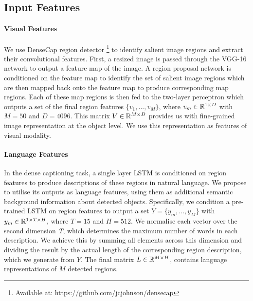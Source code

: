 \documentclass[11pt,a4paper]{article}
\newcommand{\R}{\mathbb{R}}
\begin{document}
\subsection{Input Features}

\paragraph{Visual Features}
We use DenseCap region detector \cite{densecap}\footnote{Available at: https://github.com/jcjohnson/densecap} to identify salient image regions and extract their convolutional features.
First, a resized image is passed through the VGG-16 network \cite{Simonyan2014} to output a feature map of the image.
A region proposal network is conditioned on the feature map to identify the set of salient image regions which are then mapped back onto the feature map to produce corresponding map regions.
Each of these map regions is then fed to the two-layer perceptron which outputs a set of the final region features ${\{v_1, ..., v_M\}}$, where $v_m \in \R\sp{1 \times D}$ with $M=50$ and $D=4096$.
This matrix $V \in \R\sp{M \times D}$ provides us with fine-grained image representation at the object level.
We use this representation as features of visual modality.

\paragraph{Language Features}
In the dense captioning task, a single layer LSTM is conditioned on region features to produce descriptions of these regions in natural language.
We propose to utilise its outputs as language features, using them as additional semantic background information about detected objects.
Specifically, we condition a pre-trained LSTM on region features to output a set ${Y = \{y_m, ..., y_M\}}$ with $y_m \in \R\sp{1 \times T \times H}$, where $T=15$ and $H=512$.
We normalise each vector over the second dimension \textit{T}, which determines the maximum number of words in each description. %
We achieve this by summing all elements across this dimension and dividing the result by the actual length of the corresponding region description, which we generate from $Y$.
The final matrix $L \in \R\sp{M \times H}$, contains language representations of $M$ detected regions.
\end{document}
